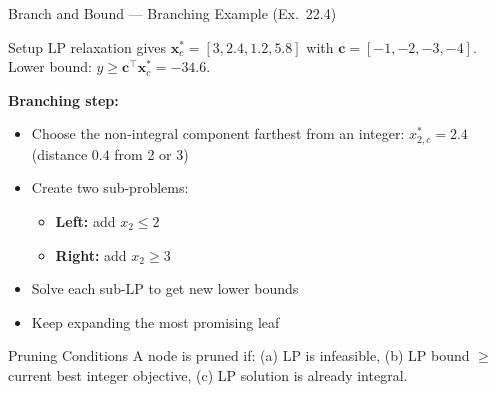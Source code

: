\documentclass[aspectratio=169,10pt]{beamer}
\newcommand{\bx}{\mathbf{x}}
\newcommand{\bc}{\mathbf{c}}
\begin{document}
\begin{frame}{Branch and Bound --- Branching Example (Ex.\ 22.4)}
  \begin{block}{Setup}
    LP relaxation gives $\bx^*_c = [3, 2.4, 1.2, 5.8]$ with
    $\bc = [-1,-2,-3,-4]$.  Lower bound: $y \geq \bc^\top\bx^*_c = -34.6$.
  \end{block}

  \textbf{Branching step:}
  \begin{itemize}
    \item Choose the non-integral component farthest from an integer:
          $x_{2,c}^* = 2.4$ (distance $0.4$ from 2 or 3)
    \item Create two sub-problems:
      \begin{itemize}
        \item \textbf{Left:} add $x_2 \leq 2$
        \item \textbf{Right:} add $x_2 \geq 3$
      \end{itemize}
    \item Solve each sub-LP to get new lower bounds
    \item Keep expanding the most promising leaf
  \end{itemize}

  \begin{alertblock}{Pruning Conditions}
    A node is pruned if:
    (a) LP is infeasible,
    (b) LP bound $\geq$ current best integer objective,
    (c) LP solution is already integral.
  \end{alertblock}
\end{frame}
\end{document}
